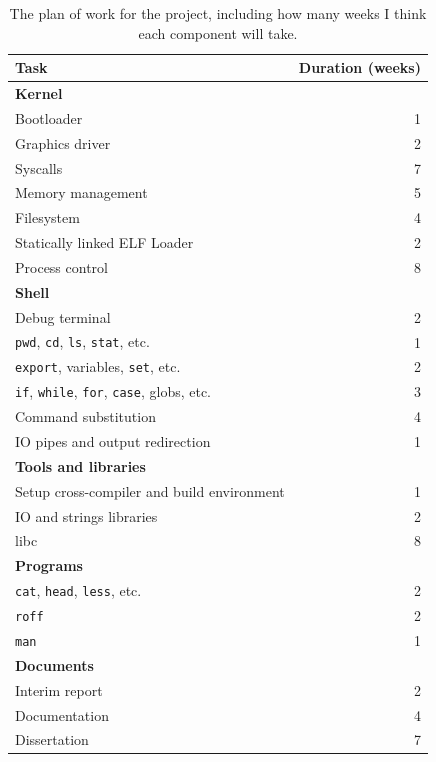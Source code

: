 \documentclass{article}
\begin{document}
\begin{table}[tbp]
\begin{center}
\begin{tabular}{|l|r|}
    \hline
    Task & Duration (weeks) \\
    \hline \textbf{Kernel} & \\
    Bootloader & 1 \\
    Graphics driver & 2 \\
    Syscalls & 7 \\
    Memory management & 5 \\
    Filesystem & 4 \\
    Statically linked ELF Loader & 2 \\
    Process control & 8 \\
    \hline \textbf{Shell} & \\
    Debug terminal & 2 \\
    \texttt{pwd}, \texttt{cd}, \texttt{ls}, \texttt{stat}, etc. & 1 \\
    \texttt{export}, variables, \texttt{set}, etc. & 2 \\
    \texttt{if}, \texttt{while}, \texttt{for}, \texttt{case}, globs, etc. & 3 \\
    Command substitution & 4 \\
    IO pipes and output redirection & 1 \\
    \hline \textbf{Tools and libraries} & \\
    Setup cross-compiler and build environment & 1 \\
    IO and strings libraries & 2 \\
    libc & 8 \\
    \hline \textbf{Programs} & \\
    \texttt{cat}, \texttt{head}, \texttt{less}, etc. & 2 \\
    \texttt{roff} & 2 \\
    \texttt{man} & 1 \\
    \hline \textbf{Documents} & \\
    Interim report & 2 \\
    Documentation & 4 \\
    Dissertation & 7 \\
    \hline
\end{tabular}
\caption{The plan of work for the project, including how many weeks I think
each component will take.}
\label{tab:interim_work_plan}
\end{center}
\end{table}
\end{document}
